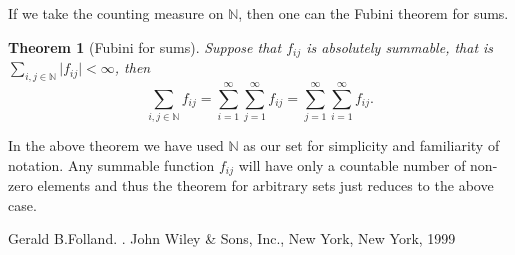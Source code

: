 \documentclass[12pt]{article}
\theoremstyle{theorem}
\newtheorem*{thm}{Theorem}
\theoremstyle{definition}
\begin{document}
If we take the counting measure on ${\mathbb{N}}$, then one can  the Fubini theorem for sums.

\begin{thm}[Fubini for sums]
Suppose that $f_{ij}$ is absolutely summable, that is
$\sum_{i,j \in {\mathbb{N}}} \lvert f_{ij}\rvert < \infty$, then
\begin{equation*}
\sum_{i,j \in {\mathbb{N}}} f_{ij}
=
\sum_{i=1}^\infty \sum_{j=1}^\infty f_{ij}
=
\sum_{j=1}^\infty \sum_{i=1}^\infty f_{ij} .
\end{equation*}
\end{thm}

In the above theorem we have used ${\mathbb{N}}$ as our  set for simplicity and familiarity of notation.  Any summable function $f_{ij}$ will have only a countable number of non-zero elements and thus the theorem for arbitrary 
sets just reduces to the above case.

\begin{thebibliography}{9}
Gerald B.\@ Folland. \emph{}. John Wiley \& Sons, Inc., New York, New York, 1999
\end{thebibliography}
\end{document}

